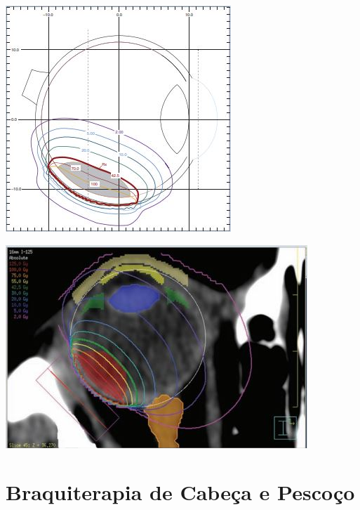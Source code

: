 \documentclass[11pt,a4paper]{article}
\begin{document}
 \includegraphics{Imagens/distribDosePlacaOftamRutenio.JPG}

 \includegraphics{Imagens/distribDosePlacaComsI125.JPG}

    \section{Braquiterapia de Cabeça e Pescoço}
\end{document}
